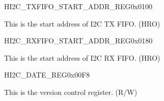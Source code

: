 \begin{register}{H}{I2C\_TXFIFO\_START\_ADDR\_REG}{0x0100}\label{regdesc:I2CTXFIFOSTARTADDRREG}
%
\regnewline%
\begin{regdesc}\begin{reglist}
\label{fielddesc:I2CTXFIFOSTARTADDR}\item [I2C\_TXFIFO\_START\_ADDR] This is the start address of I2C TX FIFO. (HRO)
\end{reglist}\end{regdesc}
\end{register}


\begin{register}{H}{I2C\_RXFIFO\_START\_ADDR\_REG}{0x0180}\label{regdesc:I2CRXFIFOSTARTADDRREG}
%
\regnewline%
\begin{regdesc}\begin{reglist}
\label{fielddesc:I2CRXFIFOSTARTADDR}\item [I2C\_RXFIFO\_START\_ADDR] This is the start address of I2C RX FIFO. (HRO)
\end{reglist}\end{regdesc}
\end{register}

\begin{register}{H}{I2C\_DATE\_REG}{0x00F8}\label{regdesc:I2CDATEREG}
%
\regnewline%
\begin{regdesc}\begin{reglist}
\label{fielddesc:I2CDATE}\item [I2C\_DATE] This is the version control register. (R/W)
\end{reglist}\end{regdesc}
\end{register}
